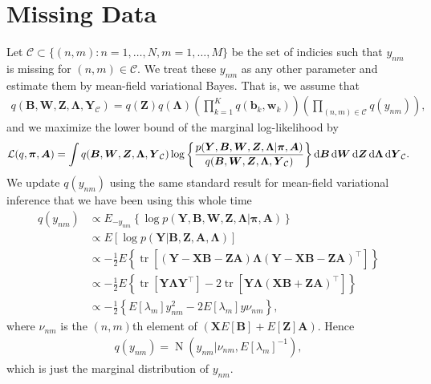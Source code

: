 \documentclass[11pt,authoryear]{article}
\DeclareMathOperator*{\tr}{tr}
\DeclareMathOperator*{\N}{N}
\newcommand{\bs}[1]{\boldsymbol{#1}}
\begin{document}
\section{Missing Data}
\label{section:missing.data}
Let $\mathcal{C} \subset \{(n,m): n = 1,\ldots, N, m = 1,\ldots,M\}$
be the set of indicies such that $y_{nm}$ is missing for $(n, m) \in
\mathcal{C}$. We treat these $y_{nm}$ as any other parameter and
estimate them by mean-field variational Bayes. That is, we assume that
\begin{align}
q(\bs{B}, \bs{W}, \bs{Z}, \bs{\Lambda}, \bs{Y}_{\mathcal{C}}) = q(\bs{Z})q(\bs{\Lambda})\left(\prod_{k = 1}^{K}q(\bs{b}_k,\bs{w}_k)\right)\left(\prod_{(n,m)\in\mathcal{C}} q(y_{nm})\right),
\end{align}
and we maximize the lower bound of the marginal log-likelihood by
\begin{align}
\mathcal{L}(q, \bs{\pi}, \bs{A}) = \int q(\bs{B}, \bs{W}, \bs{Z}, \bs{\Lambda}, \bs{Y}_{\mathcal{C}}) \log\left\{\frac{p(\bs{Y},\bs{B},\bs{W},\bs{Z},\bs{\Lambda}|\bs{\pi},\bs{A})}{q(\bs{B}, \bs{W}, \bs{Z}, \bs{\Lambda}, \bs{Y}_{\mathcal{C}})}\right\}\dif\bs{B}\dif\bs{W}\dif\bs{Z}\dif\bs{\Lambda}\dif\bs{Y}_{\mathcal{C}}.
\end{align}
We update $q(y_{nm})$ using the same standard result for mean-field variational inference that we have been using this whole time
\begin{align}
q(y_{nm}) &\propto E_{-y_{nm}}\left\{\log p(\bs{Y},\bs{B},\bs{W},\bs{Z},\bs{\Lambda}|\bs{\pi},\bs{A})\right\}\\
&\propto E\left[\log p(\bs{Y}|\bs{B}, \bs{Z}, \bs{A}, \bs{\Lambda})\right]\\
&\propto -\frac{1}{2}E\left\{\tr\left[(\bs{Y}-\bs{X}\bs{B}-\bs{Z}\bs{A})\bs{\Lambda}(\bs{Y}-\bs{X}\bs{B} - \bs{Z}\bs{A})^{\intercal}\right]\right\}\\
&\propto  -\frac{1}{2}E\left\{\tr\left[\bs{Y}\bs{\Lambda}\bs{Y}^{\intercal}\right] - 2 \tr\left[\bs{Y}\bs{\Lambda}(\bs{X}\bs{B} + \bs{Z}\bs{A})^{\intercal}\right]\right\}\\
&\propto -\frac{1}{2}\left\{E[\lambda_m] y_{nm}^2 - 2E[\lambda_m]y\nu_{nm}\right\},
\end{align}
where $\nu_{nm}$ is the $(n, m)$th element of $(\bs{X}E[\bs{B}] + E[\bs{Z}]\bs{A})$. Hence
\begin{align}
q(y_{nm}) = \N(y_{nm}|\nu_{nm}, E[\lambda_m]^{-1}),
\end{align}
which is just the marginal distribution of $y_{nm}$.
\end{document}

